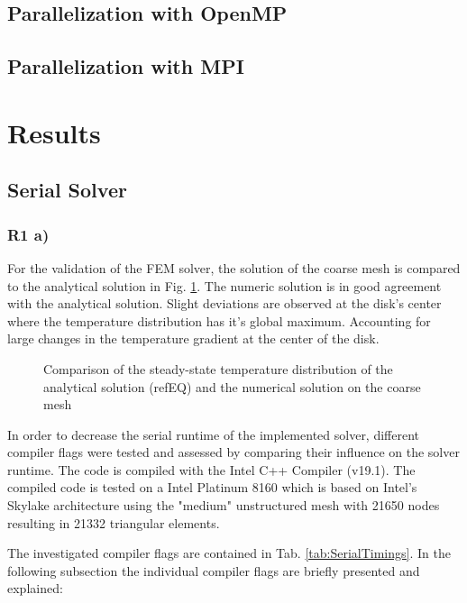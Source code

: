 \documentclass[a4paper, 11pt, oneside]{scrartcl}
\newcommand{\refFig}[1]{Fig. \ref{#1}}
\newcommand{\refTab}[1]{Tab. \ref{#1}}
\begin{document}
\subsection*{Parallelization with OpenMP}

\subsection*{Parallelization with MPI}

\section{Results}

\subsection{Serial Solver}

\subsubsection*{R1 a)}
For the validation of the FEM solver, the solution of the coarse mesh is compared to the analytical solution in \refFig{fig::TemperatureDist}. The numeric solution is in good agreement with the analytical solution. Slight deviations are observed at the disk's center where the temperature distribution has it's global maximum. Accounting for large changes in the temperature gradient at the center of the disk. 

\begin{figure}[!htbp]
	\centering
	\leavevmode
	\resizebox{0.8\width}{!}{}
	\caption{Comparison of the steady-state temperature distribution of the analytical solution (refEQ) and the numerical solution on the coarse mesh}
	\label{fig::TemperatureDist}
\end{figure}

In order to decrease the serial runtime of the implemented solver, different compiler flags were tested and assessed by comparing their influence on the solver runtime. The code is compiled with the Intel C++ Compiler (v19.1). The compiled code is tested on a Intel Platinum 8160 which is based on Intel's Skylake architecture using the "medium" unstructured mesh with 21650 nodes resulting in 21332 triangular elements.

The investigated compiler flags are contained in \refTab{tab:SerialTimings}.
In the following subsection the individual compiler flags are briefly presented and explained: 
 
\end{document}
